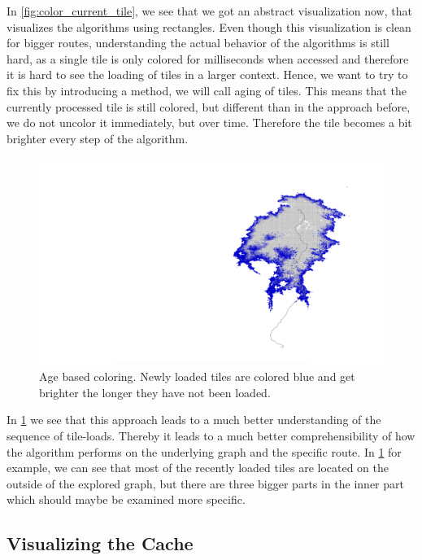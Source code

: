 \documentclass
[
	paper = a4,
    pagesize,
	12 pt,
	oneside,                       %
    open = right,
	DIV = calc,
	BCOR = 0 mm,                   %
	bibtotoc
]
{scrbook}
\begin{document}
In \cref{fig:color_current_tile}, we see that we got an abstract visualization now, that visualizes the algorithms using rectangles.
Even though this visualization is clean for bigger routes, understanding the actual behavior of the algorithms is still hard, as a single tile is only colored for milliseconds when accessed and therefore it is hard to see the loading of tiles in a larger context.
Hence, we want to try to fix this by introducing a method, we will call aging of tiles.
This means that the currently processed tile is still colored, but different than in the approach before, we do not uncolor it immediately, but over time.
Therefore the tile becomes a bit brighter every step of the algorithm.

\begin{figure}[H]
    \includegraphics[width=\textwidth]{Images/vis-aged-coloring.png}
\caption[]{Age based coloring. Newly loaded tiles are colored blue and get brighter the longer they have not been loaded.}
\label{fig:color_aged_tile}
\end{figure}

In \cref{fig:color_aged_tile} we see that this approach leads to a much better understanding of the sequence of tile-loads.
Thereby it leads to a much better comprehensibility of how the algorithm performs on the underlying graph and the specific route.
In \cref{fig:color_aged_tile} for example, we can see that most of the recently loaded tiles are located on the outside of the explored graph, but there are three bigger parts in the inner part which should maybe be examined more specific.


\subsection{Visualizing the Cache}
\end{document}
